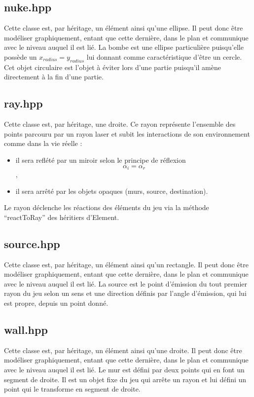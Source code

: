 \documentclass[a4paper,11pt]{report}
\begin{document}
\subsection[Bombe]{nuke.hpp}
Cette classe est, par héritage, un élément ainsi qu'une ellipse. Il peut donc
être modéliser graphiquement, entant que cette dernière, dans le plan et
communique avec le niveau auquel il est lié. La bombe est une ellipse
particulière puisqu'elle possède un $x_{radius} = y_{radius}$ lui donnant comme
caractéristique d'être un cercle. Cet objet circulaire est l'objet à éviter lors
d'une partie puisqu'il amène directement à la fin d'une partie.

\subsection[Rayon]{ray.hpp}
Cette classe est, par héritage, une droite. Ce rayon représente l'ensemble des
points parcouru par un rayon laser et subit les interactions de son
environnement comme dans la vie réelle :
\begin{itemize}
	\item il sera reflété par un miroir selon le principe de réflexion
		$$\alpha_{i} = \alpha_{r}$$,
	\item il sera arrêté par les objets opaques (murs, source, destination).
\end{itemize}

Le rayon déclenche les réactions des éléments du jeu via la méthode
``reactToRay'' des héritiers d'Element.

\subsection[Source]{source.hpp}
Cette classe est, par héritage, un élément ainsi qu'un rectangle. Il peut donc
être modéliser graphiquement, entant que cette dernière, dans le plan et
communique avec le niveau auquel il est lié. La source est le point d'émission
du tout premier rayon du jeu selon un sens et une direction définis par l'angle
d'émission, qui lui est propre, depuis un point donné.

\subsection[Mur]{wall.hpp}
Cette classe est, par héritage, un élément ainsi qu'une droite. Il peut donc
être modéliser graphiquement, entant que cette dernière, dans le plan et
communique avec le niveau auquel il est lié. Le mur est défini par deux points
qui en font un segment de droite. Il est un objet fixe du jeu qui arrête un
rayon et lui défini un point qui le transforme en segment de droite.
\end{document}
